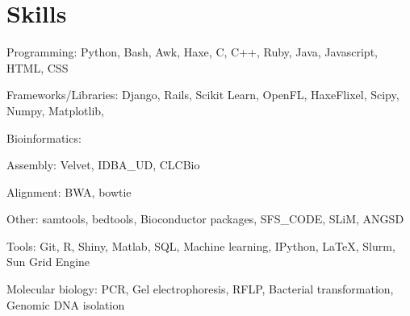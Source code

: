 \documentclass[letterpaper]{article}
\renewenvironment{itemize}{
  \begin{list}{}{
    \setlength{\leftmargin}{1.5em}
  }
}{
  \end{list}
}
\begin{document}
\section*{Skills}
\begin{itemize}
\item Programming: Python, Bash, Awk, Haxe, C, C++, Ruby, Java, Javascript, HTML, CSS
\item Frameworks/Libraries: Django, Rails, Scikit Learn, OpenFL, HaxeFlixel, Scipy, Numpy, Matplotlib, 
\item Bioinformatics:
	\begin{itemize}
	\item Assembly: Velvet, IDBA\_UD, CLCBio
	\item Alignment: BWA, bowtie
	\item Other: samtools, bedtools, Bioconductor packages, SFS\_CODE, SLiM, ANGSD
	\end{itemize} 
\item Tools: Git, R, Shiny, Matlab, SQL, Machine learning, IPython, LaTeX, Slurm, Sun Grid Engine
\item Molecular biology: PCR, Gel electrophoresis, RFLP, Bacterial transformation, Genomic DNA isolation
\end{itemize}

\end{document}

